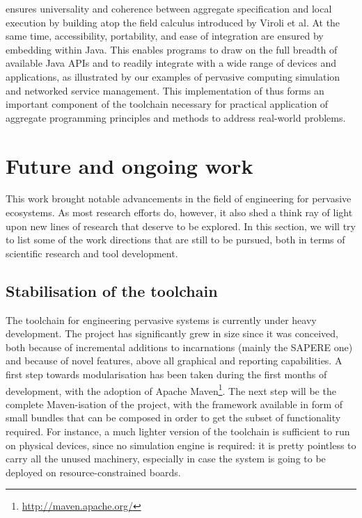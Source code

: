 \documentclass[12pt,a4paper,twoside,openright]{book}
\begin{document}
\protelis{} ensures universality and coherence between aggregate specification and local execution by building atop the field calculus introduced by Viroli et al\cite{VDB-FOCLASA-CIC2013}.
%
At the same time, accessibility, portability, and ease of integration are ensured by embedding \protelis{} within Java.
%
This enables \protelis{} programs to draw on the full breadth of available Java APIs and to readily integrate with a wide range of devices and applications, as illustrated by our examples of pervasive computing simulation and networked service management.
%
This implementation of \protelis{} thus forms an important component of the toolchain necessary for practical application of aggregate programming principles and methods to address real-world problems.

\section{Future and ongoing work}

This work brought notable advancements in the field of engineering for pervasive ecosystems.
%
As most research efforts do, however, it also shed a think ray of light upon new lines of research that deserve to be explored.
%
In this section, we will try to list some of the work directions that are still to be pursued, both in terms of scientific research and tool development.

\subsection{Stabilisation of the toolchain}

The \alchemist{} toolchain for engineering pervasive systems is currently under heavy development.
%
The project has significantly grew in size since it was conceived, both because of incremental additions to incarnations (mainly the SAPERE one) and because of novel features, above all graphical and reporting capabilities.
%
A first step towards modularisation has been taken during the first months of development, with the adoption of Apache Maven\footnote{\url{http://maven.apache.org/}}.
%
The next step will be the complete Maven-isation of the project, with the framework available in form of small bundles that can be composed in order to get the subset of functionality required.
%
For instance, a much lighter version of the toolchain is sufficient to run \protelis{} on physical devices, since no simulation engine is required: it is pretty pointless to carry all the unused machinery, especially in case the system is going to be deployed on resource-constrained boards.
\end{document}
